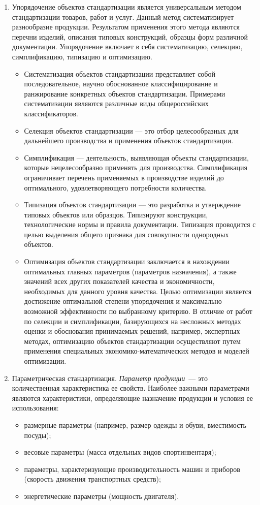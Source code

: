 \begin{enumerate}
\item Упорядочение объектов стандартизации является универсальным методом стандартизации товаров, работ и услуг. Данный метод систематизирует разнообразие продукции. Результатом применения этого метода являются перечни изделий, описания типовых конструкций, образцы форм различной документации. Упорядочение включает в себя систематизацию, селекцию, симплификацию, типизацию и оптимизацию. 
\begin{itemize}
\item Систематизация объектов стандартизации представляет собой последовательное, научно обоснованное классифицирование и ранжирование конкретных объектов стандартизации. Примерами систематизации являются различные виды общероссийских классификаторов.
\item Селекция объектов стандартизации --- это отбор целесообразных для дальнейшего производства и применения объектов стандартизации.
\item Симплификация --- деятельность, выявляющая объекты стандартизации, которые нецелесообразно применять для производства. Симплификация ограничивает перечень применяемых в производстве изделий до оптимального, удовлетворяющего потребности количества.
\item Типизация объектов стандартизации --- это разработка и утверждение типовых объектов или образцов. Типизируют конструкции, технологические нормы и правила документации. Типизация проводится с целью выделения общего признака для совокупности однородных объектов.
\item Оптимизация объектов стандартизации заключается в нахождении оптимальных главных параметров (параметров назначения), а также значений всех других показателей качества и экономичности, необходимых для данного уровня качества. Целью оптимизации является достижение оптимальной степени упорядочения и максимально возможной эффективности по выбранному критерию. В отличие от работ по селекции и симплификации, базирующихся на несложных методах оценки и обоснования принимаемых решений, например, экспертных методах, оптимизацию объектов стандартизации осуществляют путем применения специальных экономико-математических методов и моделей оптимизации.
\end{itemize}
\item  Параметрическая стандартизация. \textit{Параметр продукции}~--- это количественная характеристика ее свойств. Наиболее важными параметрами являются характеристики, определяющие назначение продукции и условия ее использования:
\begin{itemize}
\item размерные параметры (например, размер одежды и обуви, вместимость посуды);
\item весовые параметры (масса отдельных видов спортинвентаря);
\item параметры, характеризующие производительность машин и приборов (скорость движения транспортных средств);
\item энергетические параметры (мощность двигателя).
\end{itemize}


\end{enumerate}

